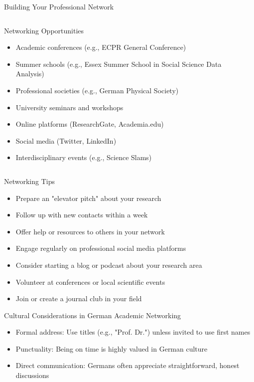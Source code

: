 \documentclass[aspectratio=169,10pt]{beamer}
\begin{document}
\begin{frame}{Building Your Professional Network}
\begin{columns}[T]
    \begin{column}{0.6\textwidth}
        \alert{Networking Opportunities}
        \begin{itemize}
            \item Academic conferences (e.g., ECPR General Conference)
            \item Summer schools (e.g., Essex Summer School in Social Science Data Analysis)
            \item Professional societies (e.g., German Physical Society)
            \item University seminars and workshops
            \item Online platforms (ResearchGate, Academia.edu)
            \item Social media (Twitter, LinkedIn)
            \item Interdisciplinary events (e.g., Science Slams)
        \end{itemize}
    \end{column}
    \begin{column}{0.4\textwidth}
    \end{column}
\end{columns}

\vspace{0.3cm}
\alert{Networking Tips}
\begin{itemize}
    \item Prepare an "elevator pitch" about your research
    \item Follow up with new contacts within a week
    \item Offer help or resources to others in your network
    \item Engage regularly on professional social media platforms
    \item Consider starting a blog or podcast about your research area
    \item Volunteer at conferences or local scientific events
    \item Join or create a journal club in your field
\end{itemize}

\alert{Cultural Considerations in German Academic Networking}
\begin{itemize}
    \item Formal address: Use titles (e.g., "Prof. Dr.") unless invited to use first names
    \item Punctuality: Being on time is highly valued in German culture
    \item Direct communication: Germans often appreciate straightforward, honest discussions
\end{itemize}
\end{frame}
\end{document}
